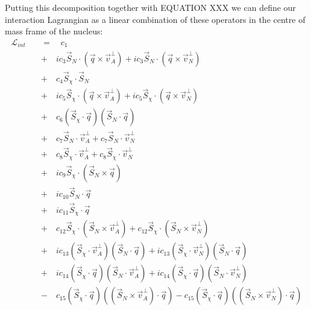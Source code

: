 \par
Putting this decomposition together with EQUATION XXX we can define our interaction Lagrangian as a linear combination of these operators in the centre of mass frame of the nucleus:
\begin{equation}
\begin{split}
    \mathcal{L}_{int}\quad  & =\quad c_1 \\
             & +\quad ic_3 \vec{S}_{N} \cdot ( \vec{q} \times \vec{v}^{\perp}_{A} ) + ic_3 \vec{S}_{N}
             \cdot( \vec{q} \times \vec{v}^{\perp}_{N} ) \\
             & +\quad c_4 \vec{S}_{\chi} \cdot \vec{S}_{N} \\
             & +\quad ic_5 \vec{S}_{\chi} \cdot(\vec{q} \times \vec{v}^{\perp}_{A}) + ic_5 \vec{S}_{\chi} \cdot ( \vec{q} \times \vec{v}^{\perp}_{N} ) \\
             & +\quad c_6 ( \vec{S}_{\chi} \cdot \vec{q} ) (\vec{S}_{N} \cdot \vec{q} ) \\
             & +\quad c_7 \vec{S}_{N} \cdot \vec{v}^{\perp}_{A} + c_7 \vec{S}_{N} \cdot \vec{v}^{\perp}_{N} \\
             & +\quad c_8 \vec{S}_{\chi} \cdot \vec{v}^{\perp}_{A} + c_8 \vec{S}_{\chi} \cdot \vec{v}^{\perp}_{N} \\
             & +\quad ic_9 \vec{S}_{\chi} \cdot ( \vec{S}_{N} \times \vec{q} ) \\
             & +\quad ic_{10} \vec{S}_{N} \cdot \vec{q} \\
             & +\quad ic_{11} \vec{S}_{\chi} \cdot \vec{q} \\
             & +\quad c_{12} \vec{S}_{\chi} \cdot ( \vec{S}_{N} \times \vec{v}^{\perp}_{A} ) + c_{12} \vec{S}_{\chi} \cdot ( \vec{S}_{N} \times \vec{v}^{\perp}_{N} ) \\
             & +\quad ic_{13} ( \vec{S}_{\chi} \cdot \vec{v}^{\perp}_{A} ) ( \vec{S}_{N} \cdot \vec{q} ) + ic_{13} ( \vec{S}_{\chi} \cdot \vec{v}^{\perp}_{N} ) ( \vec{S}_{N} \cdot \vec{q} ) \\
             & +\quad ic_{14} ( \vec{S}_{\chi} \cdot \vec{q} ) ( \vec{S}_{N} \cdot \vec{v}^{\perp}_{A} ) + ic_{14} ( \vec{S}_{\chi} \cdot \vec{q} ) ( \vec{S}_{N} \cdot \vec{v}^{\perp}_{N} ) \\
             & -\quad c_{15}(\vec{S}_{\chi} \cdot \vec{q}) ( ( \vec{S}_{N} \times \vec{v}^{\perp}_{A} ) \cdot \vec{q} ) - c_{15} ( \vec{S}_{\chi} \cdot \vec{q} ) ( ( \vec{S}_{N} \times \vec{v}^{\perp}_{N} ) \cdot \vec{q} )
\end{split}
\label{eq:eft_operator_lagrangian_com}
\end{equation}
